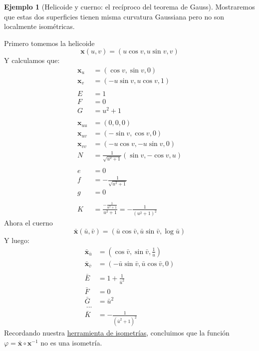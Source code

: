 \documentclass[spanish]{book}
\theoremstyle{definition}
\newtheorem*{ejem}{Ejemplo}
\begin{document}
\begin{ejem}[Helicoide y cuerno: el recíproco del teorema de Gauss]
	Mostraremos que estas dos superficies tienen misma curvatura Gaussiana pero no son localmente isométricas.
	
	Primero tomemos la helicoide
	\[{\mathbf{x}}({u},{v})= (u\cos{v},u\sin v,v)\]
	Y calculamos que:
	\begin{align*}
		\mathbf x_u&=(\cos v,\sin v,0)\\
		\mathbf x_v&=(-u\sin v,u\cos v,1)\\\\
		E&=1\\
		F&=0\\
		G&=u^2+1\\\\
		\mathbf x_{uu}&=(0,0,0)\\
		\mathbf x_{uv}&=(-\sin v,\cos v,0)\\
		\mathbf x_{vv}&=(-u\cos v,-u\sin v,0)\\
		N&=\frac{1}{\sqrt{u^2+1}}(\sin v,-\cos v,u)\\\\
		e&=0\\
		f&=-\frac{1}{\sqrt{u^2+1}}\\
		g&=0\\\\
		K&=\frac{-\frac{1}{u^2+1}}{{u^2+1}}=-\frac{1}{(u^2+1)^2}
	\end{align*}
	Ahora el cuerno
	\[\bar{\mathbf{x}}(\bar{u},\bar{v})= ( \bar u\cos{ \bar v}, \bar u\sin  \bar v,\log \bar u)\]
	Y luego:
	\begin{align*}
		\bar{\mathbf x}_{\bar{u}}&=(\cos \bar v,\sin\bar v,\frac{1}{\bar u})\\
		\bar{\mathbf x}_{\bar{v}}&=(-\bar u\sin\bar v,\bar u\cos \bar v,0)\\\\
		\bar E&=1+\frac{1}{\bar{u}^2}\\
		\bar F&=0\\
		\bar G&=\bar u^2\\\
		...\\
		\bar K&=-\frac{1}{(\bar{u}^2+1)^2}
	\end{align*}
	Recordando nuestra \hyperref[prop:reciproca]{herramienta de isometrías}, concluimos que la función $\varphi=\bar{\mathbf{x}}\circ\mathbf x^{-1}$ no es una isometría.
	

\end{ejem}
\end{document}
